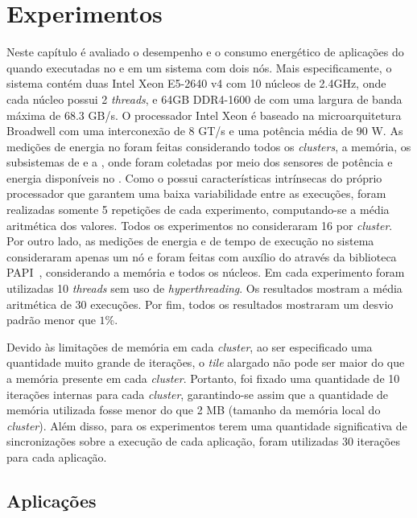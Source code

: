 \chapter{Experimentos}
\label{cha:experimentos}

Neste capítulo é avaliado o desempenho e o consumo energético de aplicações
\stencil do \pskel quando executadas no \mppa e em um sistema \numa com dois
nós. Mais especificamente, o sistema contém duas  Intel Xeon
E5-2640 v4 com 10 núcleos de 2.4GHz, onde cada núcleo possui 2 \textit{threads}, e 64GB DDR4-1600 de \ram com uma largura de
banda máxima de 68.3 GB/s. O processador Intel Xeon é baseado na
microarquitetura Broadwell com uma interconexão \qpi de 8 GT/s e uma potência
média de 90 W. As medições de energia no \mppa
foram feitas considerando todos os \textit{clusters}, a memória, os subsistemas
de \es e a \noc, onde foram coletadas por meio dos sensores de potência e
energia disponíveis no \mppa. Como o \mppa possui características intrínsecas do
próprio processador que garantem uma baixa variabilidade entre as execuções, foram
realizadas somente 5 repetições de cada experimento, computando-se a média
aritmética dos valores. Todos os experimentos no \mppa consideraram 16
\pes por \textit{cluster}. Por outro lado, as medições de energia e de tempo de execução no
sistema \numa consideraram apenas um nó e foram feitas com auxílio do \rapl através da biblioteca
PAPI~\cite{papi12}, considerando a memória e todos os núcleos.
Em cada experimento foram utilizadas 10 \textit{threads} sem uso de
\textit{hyperthreading}. Os resultados mostram a média aritmética de 30
execuções. Por fim, todos os resultados mostraram um desvio padrão menor que
$1$\%.

Devido às limitações de memória em cada \textit{cluster}, ao ser especificado
uma quantidade muito grande de iterações, o \textit{tile} alargado não pode ser
maior do que a memória presente em cada \textit{cluster}. Portanto, foi fixado
uma quantidade de 10 iterações internas para cada \textit{cluster}, garantindo-se assim
que a quantidade de memória utilizada fosse menor do que 2 MB (tamanho da memória
local do \textit{cluster}). Além disso,
para os experimentos terem uma quantidade significativa de sincronizações sobre
a execução de cada aplicação, foram utilizadas 30 iterações para cada aplicação.

\section{Aplicações \stencil}
\label{cha:aplicacoes}

